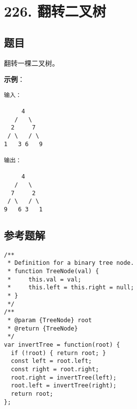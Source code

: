 \newpage
\section{226. 翻转二叉树}
\label{leetcode:226}

\subsection{题目}

翻转一棵二叉树。

\textbf{示例}：

\begin{verbatim}
输入：

     4
   /   \
  2     7
 / \   / \
1   3 6   9

输出：

     4
   /   \
  7     2
 / \   / \
9   6 3   1
\end{verbatim}

\subsection{参考题解}

\begin{verbatim}
/**
 * Definition for a binary tree node.
 * function TreeNode(val) {
 *     this.val = val;
 *     this.left = this.right = null;
 * }
 */
/**
 * @param {TreeNode} root
 * @return {TreeNode}
 */
var invertTree = function(root) {
  if (!root) { return root; }
  const left = root.left;
  const right = root.right;
  root.right = invertTree(left);
  root.left = invertTree(right);
  return root;
};
\end{verbatim}
